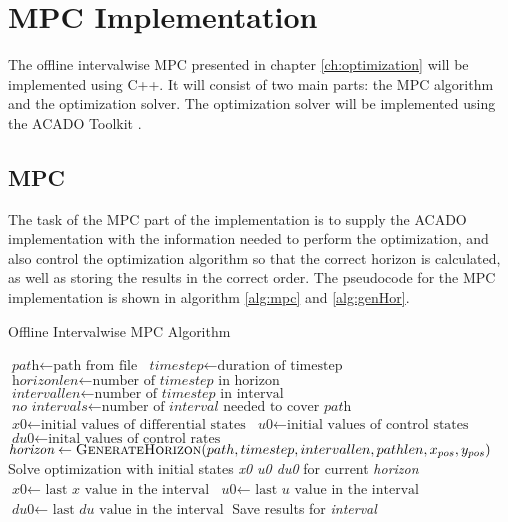 \chapter{MPC Implementation}

The offline intervalwise MPC presented in chapter \ref{ch:optimization} will be implemented using C++. It will consist of two main parts: the MPC algorithm and the optimization solver. The optimization solver will be implemented using the ACADO Toolkit \cite{acadoHOUSKA}.


\section{MPC}

The task of the MPC part of the implementation is to supply the ACADO implementation with the information needed to perform the optimization, and also control the optimization algorithm so that the correct horizon is calculated, as well as storing the results in the correct order. The pseudocode for the MPC implementation is shown in algorithm \ref{alg:mpc} and \ref{alg:genHor}.

\begin{algorithm}
\caption{Offline Intervalwise MPC Algorithm}
\label{alg:mpc}
\begin{algorithmic}
	\State $\textit{path} \gets \text{path from file}$
	\State $\textit{timestep} \gets \text{duration of timestep}$
	\State $\textit{horizonlen} \gets \text{number of } \textit{timestep} \text{ in horizon}$
	\State $\textit{intervallen} \gets \text{number of } \textit{timestep} \text{ in interval}$
	\State $\textit{no intervals} \gets \text{number of } \textit{interval} \text{ needed to cover } \textit{path}$
	\State $\textit{x0} \gets \text{initial values of differential states}$
	\State $\textit{u0} \gets \text{initial values of control states}$
	\State $\textit{du0} \gets \text{inital values of control rates}$
		\State $\textit{horizon} \gets \Call{GenerateHorizon}{path, timestep, intervallen, pathlen, x_{pos}, y_{pos}}$
		\State Solve optimization with initial states \textit{x0 u0 du0} for current \textit{horizon}
		\State $\textit{x0} \gets \text{ last } \textit{x} \text{ value in the interval}$
		\State $\textit{u0} \gets \text{ last } \textit{u} \text{ value in the interval}$
		\State $\textit{du0} \gets \text{ last } \textit{du} \text{ value in the interval}$
		\State Save results for \textit{interval}
	\EndFor
\EndProcedure
\end{algorithmic}
\end{algorithm}

